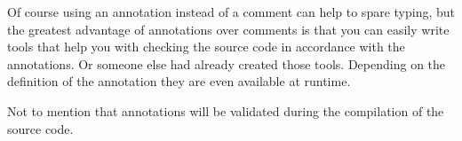 Of course using an annotation instead of a comment can help to spare typing, but the greatest advantage of annotations over comments is that you can easily write tools that help you with checking the source code in accordance with the annotations. Or someone else had already created those tools. Depending on the definition of the annotation they are even available at runtime.

Not to mention that annotations will be validated during the compilation of the source code.


